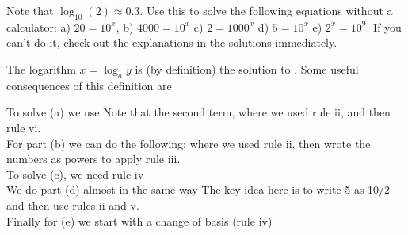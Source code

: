 
Note that $\log_{10}(2)\approx 0.3$. Use this to solve the following equations without a calculator: a) $20=10^x$, b) $4000=10^x$ c) $2=1000^x$ d) $5=10^x$ e) $2^x=10^9$. If you can't do it, check out the explanations in the solutions immediately.

\solution
The logarithm $x=\log_a{y}$ is (by definition) the solution to . Some useful consequences of this definition are 

\noindent{}To solve (a) we use
Note that the second term, where we used rule ii, and then rule vi.\\[0.5em] 
For part (b) we can do the following:
where we used rule ii, then wrote the numbers as powers to apply rule iii.\\[0.5em]
To solve (c), we need rule iv
\\[0.5em]
We do part (d) almost in the same way
The key idea here is to write 5 as 10/2 and then use rules ii and v.
\\[0.5em]
Finally for (e) we start with a change of basis (rule iv)
